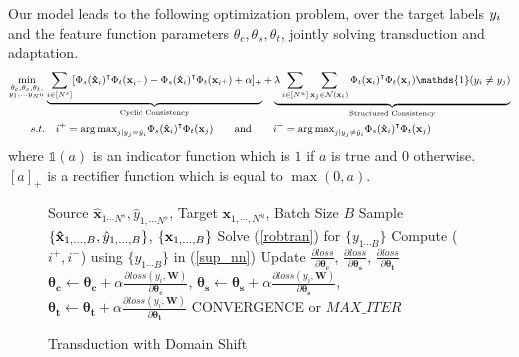Our model leads to the following optimization problem, over the target labels $y_i$ and the feature function parameters $\theta_c, \theta_s, \theta_t$, jointly solving transduction and adaptation. 
\begin{equation}
\small
\begin{aligned}
\min_{\substack{\theta_c,\theta_s,\theta_t, \\ y_1, \ldots y_{N^u}}} &\underbrace{\sum_{i \in [N^s]} [\Phi_s(\xsi)^\intercal \Phi_t(\mathbf{x}_{i^-}) -\Phi_s(\xsi)^\intercal \Phi_t(\mathbf{x}_{i^+}) + \alpha]_{+}}_{\text{Cyclic Consistency}}  +\underbrace{\lambda \sum_{i \in [N^u]} \sum_{\xuj \in \mathcal{N}(\xui)}  \Phi_t(\xui)^\intercal \Phi_t(\xuj) \mathds{1}(y_i \neq y_j)}_{\text{Structured Consistency}}\\
s.t. &\quad i^{+} = {\arg\max}_{j | y_j = \hat{y}_i} \Phi_s(\xsi)^\intercal \Phi_t(\xuj) \quad \quad \text{and} \quad \quad  i^{-} = {\arg\max}_{j | y_j \neq \hat{y}_i}  \Phi_s(\xsi)^\intercal \Phi_t(\xuj)
\end{aligned}
\label{loss}
\end{equation}
where $\mathds{1}(a)$ is an indicator function which is $1$ if $a$ is true and $0$ otherwise. $[a]_+$ is a rectifier function which is equal to $\max(0, a)$.
\begin{figure}
    \begin{minipage}{0.5\textwidth}
    \vspace{-1mm}
\begin{algorithm}[H]
   \caption{Transduction with Domain Shift}
   \label{alg:example}
  \small
\begin{algorithmic}
    Source $\mathbf{\hat{x}}_{1 \cdots N^s},\hat{y}_{1, \cdots N^s}$, Target $\mathbf{x}_{1,\cdots,N^u}$, Batch Size $B$
   \REPEAT
   \STATE  Sample $\{\mathbf{\hat{x}}_{1,\ldots,B},\hat{y}_{1,\ldots,B} \}$, $\{\mathbf{x}_{1,\ldots,B}\}$
   \STATE Solve (\ref{robtran}) for $\{y_{1 \cdots B}\}$
   \STATE Compute ($i^+, i^-$) using $\{y_{1 \cdots B}\}$ in (\ref{sup_nn})
   \STATE Update $\frac{\partial loss}{\partial \mathbf{\theta_c}}$,  $\frac{\partial loss}{\partial \mathbf{\theta_s}}$, $\frac{\partial loss}{\partial \mathbf{\theta_t}}$
   \ENDIF
   \ENDFOR
   \STATE $\mathbf{\theta_c} \leftarrow \mathbf{\theta_c} + \alpha \frac{\partial loss (y_i, \mathbf{W})}{\partial \mathbf{\theta_c}}$, $\mathbf{\theta_s} \leftarrow \mathbf{\theta_s} + \alpha \frac{\partial loss (y_i, \mathbf{W})}{\partial \mathbf{\theta_s}}$, $\mathbf{\theta_t} \leftarrow \mathbf{\theta_t} + \alpha \frac{\partial loss (y_i, \mathbf{W})}{\partial \mathbf{\theta_t}}$
   \UNTIL CONVERGENCE or $MAX\_ITER$
\end{algorithmic}
\end{algorithm}
\vspace{-17mm}
  \end{minipage}
  \end{figure}


